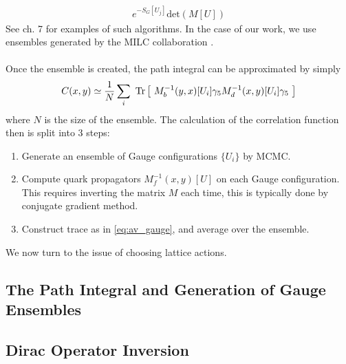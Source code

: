 \begin{align}
	e^{-S_G[U_j]}\text{det}(M[U])
	\label{eq:MCweight}
\end{align}
See \cite{DeGrand:2006zz} ch. 7 for examples of such algorithms. In the case of our work, we use ensembles generated by the MILC collaboration \cite{Bazavov:2012xda}.
\\ \\
Once the ensemble is created, the path integral can be approximated by simply
\begin{align}
  C(x,y) \simeq {1\over N} \sum_i \text{ Tr}\left[\text{ } M^{-1}_b(y,x)[U_i] \gamma_5 M^{-1}_d(x,y)[U_i] \gamma_5 \text{ }\right]
  \label{eq:av_gauge}
\end{align}
where $N$ is the size of the ensemble. The calculation of the correlation function then is split into 3 steps:
\begin{enumerate}
	\item
	Generate an ensemble of Gauge configurations $\{ U_i \}$ by MCMC.
	\item
	Compute quark propagators $M^{-1}_f(x,y)[U]$ on each Gauge configuration. This requires inverting the matrix $M$ each time, this is typically done by conjugate gradient method.
	\item
	Construct trace as in \eqref{eq:av_gauge}, and average over the ensemble.
\end{enumerate}
We now turn to the issue of choosing lattice actions.

\subsection{The Path Integral and Generation of Gauge Ensembles}

{}

\subsection{Dirac Operator Inversion}

{}

